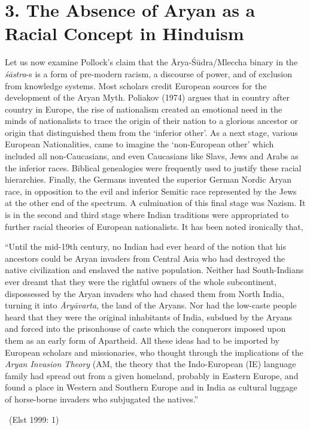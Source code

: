 \vspace{-.3cm}

\section*{3. The Absence of Aryan as \hfill\break a Racial Concept in Hinduism}

Let us now examine Pollock’s claim that the Ārya-Śūdra/Mleccha binary in the \textit{śāstra}-s  is a form of pre-modern racism, a discourse of power, and of exclusion from knowledge systems. Most scholars credit European sources for the development of the Aryan Myth. Poliakov (1974) argues that in country after country in Europe, the rise of nationalism created an emotional need in the minds of nationalists to trace the origin of their nation to a glorious ancestor or origin that distinguished them from the ‘inferior other’. As a next stage, various European Nationalities, came to imagine the ‘non-European other’ which included all non-Caucasians, and even Caucasians like Slavs, Jews and Arabs as the inferior races. Biblical genealogies were frequently used to justify these racial hierarchies. Finally, the Germans invented the superior German Nordic Aryan race, in opposition to the evil and inferior Semitic race represented by the Jews at the other end of the spectrum. A culmination of this final stage was Nazism. It is in the second and third stage where Indian traditions were appropriated to further racial theories of European nationalists. It has been noted ironically that,

\begin{myquote}
“Until the mid-19th century, no Indian had ever heard of the notion that his ancestors could be Aryan invaders from Central Asia who had destroyed the native civilization and enslaved the native population. Neither had South-Indians ever dreamt that they were the rightful owners of the whole subcontinent, dispossessed by the Aryan invaders who had chased them from North India, turning it into \textit{Āryāvarta}, the land of the Aryans. Nor had the low-caste people heard that they were the original inhabitants of India, subdued by the Aryans and forced into the prisonhouse of caste which the conquerors imposed upon them as an early form of Apartheid. All these ideas had to be imported by European scholars and missionaries, who thought through the implications of the \textit{Aryan Invasion Theory} (AM, the theory that the Indo-European (IE) language family had spread out from a given homeland, probably in Eastern Europe, and found a place in Western and Southern Europe and in India as cultural luggage of horse-borne invaders who subjugated the natives.” 

~\hfill (Elst 1999: 1)
\end{myquote}


